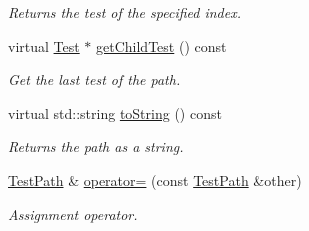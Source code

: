 \begin{DoxyCompactItemize}
\begin{DoxyCompactList}\small\item\em Returns the test of the specified index. \end{DoxyCompactList}\item 
virtual \hyperlink{class_test}{Test} $\ast$ \hyperlink{class_test_path_abd8fdd67607d785e26e844ee0b90366c}{get\+Child\+Test} () const 
\begin{DoxyCompactList}\small\item\em Get the last test of the path. \end{DoxyCompactList}\item 
virtual std\+::string \hyperlink{class_test_path_a75ec4a351f0734cefbf449325d7442ee}{to\+String} () const 
\begin{DoxyCompactList}\small\item\em Returns the path as a string. \end{DoxyCompactList}\item 
\hyperlink{class_test_path}{Test\+Path} \& \hyperlink{class_test_path_aff11ba5cda48eb2a9c657e848650945f}{operator=} (const \hyperlink{class_test_path}{Test\+Path} \&other)
\begin{DoxyCompactList}\small\item\em Assignment operator. \end{DoxyCompactList}\end{DoxyCompactItemize}
